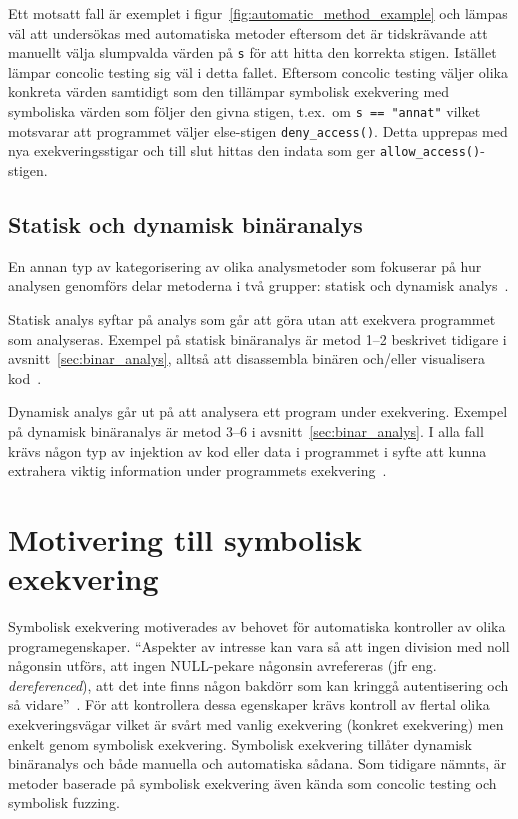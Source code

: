 Ett motsatt fall är exemplet i figur~\ref{fig:automatic_method_example} och
lämpas väl att undersökas med automatiska metoder eftersom det är tidskrävande
att manuellt välja slumpvalda värden på \texttt{s} för att hitta den korrekta
stigen. Istället lämpar concolic testing sig väl i detta fallet. Eftersom
concolic testing väljer olika konkreta värden samtidigt som den tillämpar
symbolisk exekvering med symboliska värden som följer den givna stigen, t.ex.\
om \lstinline{s == "annat"} vilket motsvarar att programmet väljer else-stigen
\lstinline{deny_access()}. Detta upprepas med nya exekveringsstigar och till slut
hittas den indata som ger \lstinline{allow_access()}-stigen.


\subsection{Statisk och dynamisk binäranalys}
En annan typ av kategorisering av olika analysmetoder som fokuserar på hur
analysen genomförs delar metoderna i två grupper: statisk och dynamisk
analys~\cite{dynamic_bin_analysis}.

Statisk analys syftar på analys som går att göra utan att exekvera programmet
som analyseras. Exempel på statisk binäranalys är metod 1--2 beskrivet tidigare
i avsnitt~\ref{sec:binar_analys}, alltså att disassembla binären och/eller
visualisera kod~\cite{dynamic_bin_analysis}.

Dynamisk analys går ut på att analysera ett program under
exekvering. Exempel på dynamisk binäranalys är metod 3--6 i
avsnitt~\ref{sec:binar_analys}. I alla fall krävs någon typ av injektion av kod
eller data i programmet i syfte att kunna extrahera viktig information under
programmets exekvering~\cite{dynamic_bin_analysis}.

\section{Motivering till symbolisk exekvering}
Symbolisk exekvering motiverades av behovet för automatiska kontroller av olika
programegenskaper. ``Aspekter av intresse kan vara så att ingen division med
noll någonsin utförs, att ingen NULL-pekare någonsin avrefereras (jfr eng.
\emph{dereferenced}), att det inte finns någon bakdörr som kan kringgå
autentisering och så vidare''~\cite{survey_symb_exc}. För att kontrollera dessa
egenskaper krävs kontroll av flertal olika exekveringsvägar vilket är svårt med
vanlig exekvering (konkret exekvering) men enkelt genom symbolisk exekvering.
Symbolisk exekvering tillåter dynamisk binäranalys och både manuella och
automatiska sådana. Som tidigare nämnts, är metoder baserade på symbolisk
exekvering även kända som concolic testing och symbolisk fuzzing.


